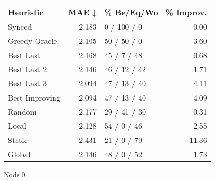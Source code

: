\begin{tabular}{lrlr}
\toprule
\textbf{Heuristic} & \textbf{MAE ↓} & \textbf{\% Be/Eq/Wo} & \textbf{\% Improv.} \\
\midrule
            Synced &          2.183 &          0 / 100 / 0 &                0.00 \\
     Greedy Oracle &          2.105 &          50 / 50 / 0 &                3.60 \\
         Best Last &          2.168 &          45 / 7 / 48 &                0.68 \\
       Best Last 2 &          2.146 &         46 / 12 / 42 &                1.71 \\
       Best Last 3 &          2.094 &         47 / 13 / 40 &                4.11 \\
    Best Improving &          2.094 &         47 / 13 / 40 &                4.09 \\
            Random &          2.177 &         29 / 41 / 30 &                0.31 \\
             Local &          2.128 &          54 / 0 / 46 &                2.55 \\
            Static &          2.431 &          21 / 0 / 79 &              -11.36 \\
            Global &          2.146 &          48 / 0 / 52 &                1.73 \\
\bottomrule
\end{tabular}
\caption{Node 0}
\label{tab:ds_iid_lr05_le1_bs2_0}
